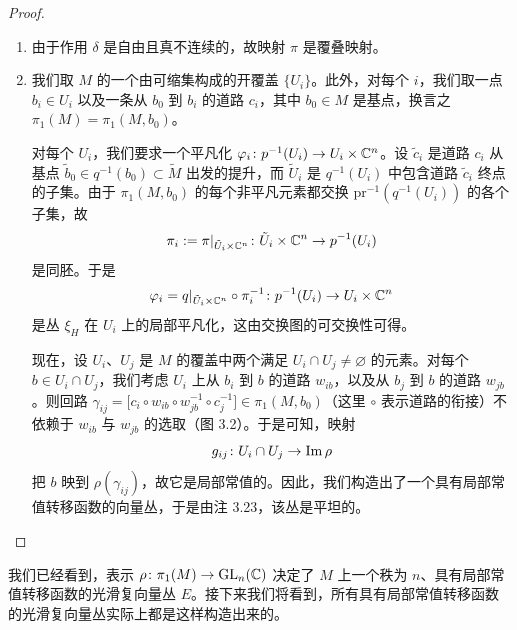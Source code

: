 \begin{proof}
\begin{enumerate}[label=\arabic*.]
\item 由于作用 $\delta$ 是自由且真不连续的，故映射 $\pi$ 是覆叠映射。
\item 我们取 $M$ 的一个由可缩集构成的开覆盖 $\{U_i\}$。此外，对每个 $i$，我们取一点 $b_i\in U_i$ 以及一条从 $b_0$ 到 $b_i$ 的道路 $c_i$，其中 $b_0\in M$ 是基点，换言之 $\pi_1(M)=\pi_1(M,b_0)$。

对每个 $U_i$，我们要求一个平凡化 $\varphi_i\colon p^{-1}(U_i)\to U_i\times\mathbb{C}^n$。设 $\tilde c_i$ 是道路 $c_i$ 从基点 $\tilde b_0\in q^{-1}(b_0)\subset\tilde M$ 出发的提升，而 $\tilde U_i$ 是 $q^{-1}(U_i)$ 中包含道路 $\tilde c_i$ 终点的子集。由于 $\pi_1(M,b_0)$ 的每个非平凡元素都交换 $\mathrm{pr}^{-1}(q^{-1}(U_i))$ 的各个子集，故
\[
\pi_i:=\pi|_{\tilde U_i\times\mathbb{C}^n}\colon \tilde U_i\times\mathbb{C}^n\to p^{-1}(U_i)
\]
是同胚。于是
\[
\varphi_i=q|_{\tilde U_i\times\mathbb{C}^n}\circ\pi_i^{-1}\colon p^{-1}(U_i)\to U_i\times\mathbb{C}^n
\]
是丛 $\xi_H$ 在 $U_i$ 上的局部平凡化，这由交换图的可交换性可得。

现在，设 $U_i$、$U_j$ 是 $M$ 的覆盖中两个满足 $U_i\cap U_j\neq\varnothing$ 的元素。对每个 $b\in U_i\cap U_j$，我们考虑 $U_i$ 上从 $b_i$ 到 $b$ 的道路 $w_{ib}$，以及从 $b_j$ 到 $b$ 的道路 $w_{jb}$。则回路 $\gamma_{ij}=\big[c_i\circ w_{ib}\circ w_{jb}^{-1}\circ c_j^{-1}\big]\in\pi_1(M,b_0)$（这里 $\circ$ 表示道路的衔接）不依赖于 $w_{ib}$ 与 $w_{jb}$ 的选取（图 3.2）。于是可知，映射
\[
g_{ij}\colon U_i\cap U_j\to\operatorname{Im}\rho
\]
把 $b$ 映到 $\rho(\gamma_{ij})$，故它是局部常值的。因此，我们构造出了一个具有局部常值转移函数的向量丛，于是由注 3.23，该丛是平坦的。
\end{enumerate}
\end{proof}

我们已经看到，表示 $\rho\colon\pi_1(M)\to\operatorname{GL}_n(\mathbb{C})$ 决定了 $M$ 上一个秩为 $n$、具有局部常值转移函数的光滑复向量丛 $E$。接下来我们将看到，所有具有局部常值转移函数的光滑复向量丛实际上都是这样构造出来的。

